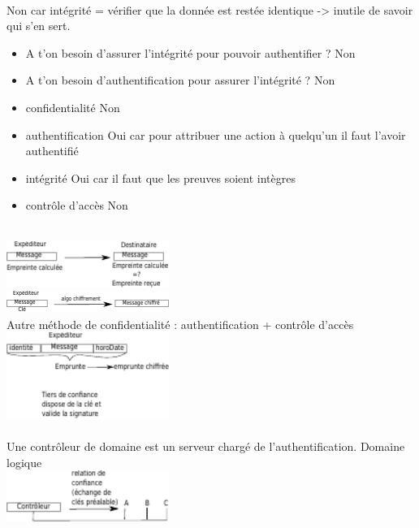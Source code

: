  \\Non car intégrité = vérifier que la donnée est restée identique -> inutile de savoir qui s'en sert.
	\begin{itemize}
		\item A t'on besoin d'assurer l'intégrité pour pouvoir authentifier ? Non
		\item A t'on besoin d'authentification pour assurer l'intégrité ? Non
	\end{itemize}

	\begin{itemize}
		\item confidentialité Non
		\item authentification Oui car pour attribuer une action à quelqu'un il faut l'avoir authentifié
		\item intégrité Oui car il faut que les preuves soient intègres
		\item contrôle d'accès Non
	\end{itemize}

 \\
	\includegraphics[width=200px]{Images/01_integrite.pdf}\\
	\includegraphics[width=200px]{Images/02_chiffrement1.pdf}\\
	Autre méthode de confidentialité : authentification + contrôle d'accès\\
	\includegraphics[width=200px]{Images/03_nonRepudiation.pdf}\\

 \\Une contrôleur de domaine est un serveur chargé de l'authentification. Domaine logique \\
	\includegraphics[width=200px]{Images/04_controle.pdf}\\

